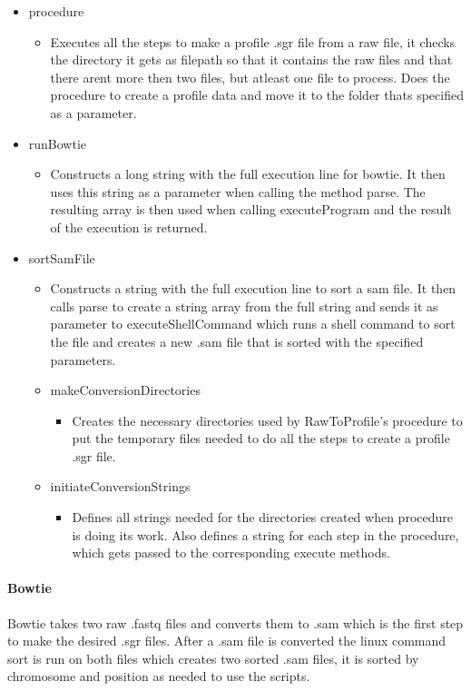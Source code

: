 \begin{itemize} 
\item procedure
\begin{itemize}
\item Executes all the steps to make a profile .sgr file from a raw file, it checks the directory it gets as filepath so that it contains the raw files and that there arent more then two files, but atleast one file to process. Does the procedure to create a profile data and move it to the folder thats specified as a parameter.
\end{itemize}

\item runBowtie
\begin{itemize}
\item Constructs a long string with the full execution line for bowtie. It then uses this string as a parameter when calling the method parse. 
The resulting array is then used when calling executeProgram and the result of the execution is returned.
\end{itemize}
\item sortSamFile
\begin{itemize}
\item Constructs a string with the full execution line to sort a sam file. It then calls parse to create a string array from the full string and sends it as parameter to executeShellCommand which runs a shell command to sort the file and creates a new .sam file that is sorted with the specified parameters.
\item makeConversionDirectories
\begin{itemize}
\item Creates the necessary directories used by RawToProfile's procedure to put the temporary files needed to do all the steps to create a profile .sgr file.
\end{itemize}
\item initiateConversionStrings
\begin{itemize}
\item Defines all strings needed for the directories created when procedure is doing its work. Also defines a string for each step in the procedure, which gets passed to the corresponding execute methods. 
\end{itemize}
\end{itemize}
\end{itemize}

\paragraph{Bowtie}
Bowtie takes two raw .fastq files and converts them to .sam which is the first step to make the desired .sgr files. After a .sam file is converted the linux command sort is run  on both files which creates two sorted .sam files, it is sorted by chromosome and position as needed to use the scripts.
